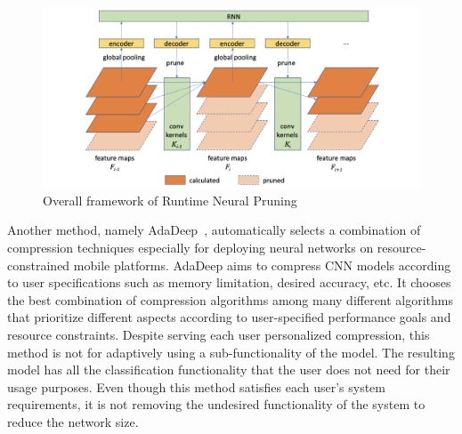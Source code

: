 \begin{figure}
    \centering
    \includegraphics[width=\textwidth]{thesis/images/runtimenp-fig.png}
    \caption{Overall framework of Runtime Neural Pruning~\cite{Lin2017RuntimeNP}}
    \label{fig:runtimenp}
\end{figure}

Another method, namely AdaDeep~\cite{Liu2018OnDemandDM}, automatically selects a combination of compression techniques especially for deploying neural networks on resource-constrained mobile platforms. 
AdaDeep aims to compress CNN models according to user specifications such as memory limitation, desired accuracy, etc. 
It chooses the best combination of compression algorithms among many different algorithms that prioritize different aspects according to user-specified performance goals and resource constraints. 
Despite serving each user personalized compression, this method is not for adaptively using a sub-functionality of the model.
The resulting model has all the classification functionality that the user does not need for their usage purposes. 
Even though this method satisfies each user's system requirements, it is not removing the undesired functionality of the system to reduce the network size.


